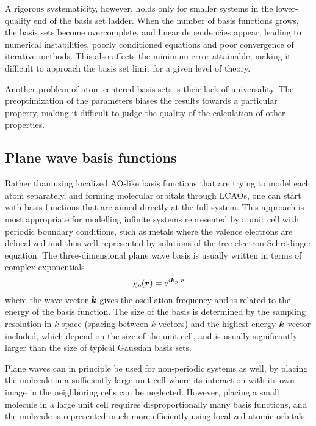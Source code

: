 A rigorous systematicity, however, holds only for smaller systems in the lower-quality end of the basis
set ladder. When the number of basis functions grows, the basis sets become overcomplete, and linear
dependencies appear, leading to numerical instabilities, poorly conditioned equations and poor
convergence of iterative methods. This also affects the minimum error attainable, making it difficult 
to approach the basis set limit for a given level of theory.

Another problem of atom-centered basis sets is their lack of universality. The preoptimization of the
parameters biases the results towards a particular property, making it difficult to judge the quality 
of the calculation of other properties.

\subsection{Plane wave basis functions}
Rather than using localized AO-like basis functions that are trying to model 
each atom separately, and forming molecular orbitals through LCAOs, one can 
start with basis functions that are aimed directly at the full system. This 
approach is most appropriate for modelling infinite systems represented by
a unit cell with periodic boundary conditions, such as metals where the 
valence electrons are delocalized and thus well represented by solutions of 
the free electron Schr\"{o}dinger equation. The three-dimensional plane wave 
basis is usually written in terms of complex exponentials
\begin{equation}
    \chi_p(\boldsymbol r) = e^{i\boldsymbol k_p\cdot\boldsymbol r}
\end{equation}
where the wave vector $\boldsymbol k$ gives the oscillation frequency and is related 
to the energy of the basis function. The size of the basis is determined by 
the sampling resolution in $k$-space (spacing between $k$-vectors) and the 
highest energy $\boldsymbol k$-vector included, which depend on the size of the unit 
cell, and is usually significantly larger than the size of typical Gaussian 
basis sets. 

Plane waves can in principle be used for non-periodic systems as well, by 
placing the molecule in a sufficiently large unit cell where its interaction 
with its own image in the neighboring cells can be neglected. However, placing 
a small molecule in a large unit cell requires disproportionally many basis 
functions, and the molecule is represented much more efficiently using 
localized atomic orbitals.

